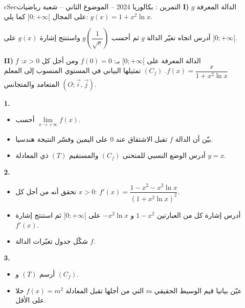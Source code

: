 \documentclass[12pt,a4paper]{article}
\newenvironment{BOX}[2]{\begin{otherlanguage}{english}\begin{arbox}{#1}{#2}}{\end{arbox}\end{otherlanguage}}
\newcounter{exo}
\newenvironment{tamrin}[1]{\stepcounter{exo}\begin{BOX}{cSec}{التمرين \theexo: #1}}{\end{BOX}}
\newenvironment{sq}{\begin{itemize}[leftmargin=2.4em,itemsep=3pt]}{\end{itemize}}
\newcommand{\qa}{\item[(أ)]}\newcommand{\qb}{\item[(ب)]}\newcommand{\qc}{\item[(جـ)]}\newcommand{\qd}{\item[(د)]}\newcommand{\qe}{\item[(هـ)]}
\newcommand{\QQ}[1]{\par\smallskip\textbf{#1.} }
\begin{document}
\begin{tamrin}{بكالوريا 2024 -- الموضوع الثاني -- شعبة رياضيات}
\textbf{I)} $g$ الدالة المعرفة على المجال $]0;+\infty[$ كما يلي: $g(x)=1+x^2\ln x$.

أدرس اتجاه تغيّر الدالة $g$ ثم أحسب $g\left(\dfrac{1}{\sqrt e}\right)$ واستنتج إشارة $g(x)$ على $]0;+\infty[$.

\textbf{II)} $f$ الدالة المعرفة على $[0;+\infty[$ بـ: $f(0)=0$ ومن أجل كل $x>0$: $f(x)=\dfrac{x}{1+x^2\ln x}$.
$(C_f)$ تمثيلها البياني في المستوي المنسوب إلى المعلم المتعامد والمتجانس $(O;\vec i,\vec j)$.
\QQ{1}
\begin{sq}
\qa أحسب $\lim\limits_{x\to +\infty}f(x)$.
\qb بيّن أن الدالة $f$ تقبل الاشتقاق عند $0$ على اليمين وفسّر النتيجة هندسيا.
\qc أدرس الوضع النسبي للمنحنى $(C_f)$ والمستقيم $(T)$ ذي المعادلة $y=x$.
\end{sq}
\QQ{2}
\begin{sq}
\qa تحقق أنه من أجل كل $x>0$: $f'(x)=\dfrac{1-x^2-x^2\ln x}{(1+x^2\ln x)^2}$.
\qb أدرس إشارة كل من العبارتين $1-x^2$ و $-x^2\ln x$ على $]0;+\infty[$ ثم استنتج إشارة $f'(x)$.
\qc شكّل جدول تغيّرات الدالة $f$.
\end{sq}
\QQ{3}
\begin{sq}
\qa أرسم $(T)$ و $(C_f)$.
\qb عيّن بيانيا قيم الوسيط الحقيقي $m$ التي من أجلها تقبل المعادلة $f(x)=m^2$ حلا على الأقل.
\end{sq}
\end{tamrin}
\end{document}
